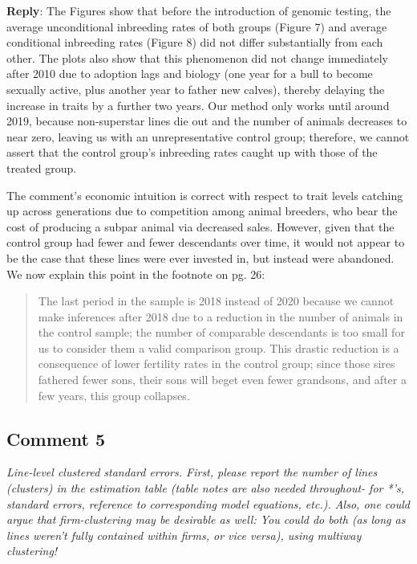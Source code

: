 \documentclass[12pt,letterpaper]{article}
\begin{document}
\textbf{Reply}: The Figures show that before the introduction of genomic testing, the average unconditional inbreeding rates of both groups (Figure 7) and average conditional inbreeding rates (Figure 8) did not differ substantially from each other. The plots also show that this phenomenon did not change immediately after 2010 due to adoption lags and biology (one year for a bull to become sexually active, plus another year to father new calves), thereby delaying the increase in traits by a further two years. Our method only works until around 2019, because non-superstar lines die out and the number of animals decreases to near zero, leaving us with an unrepresentative control group; therefore, we cannot assert that the control group's inbreeding rates caught up with those of the treated group.

The comment's economic intuition is correct with respect to trait levels catching up across generations due to competition among animal breeders, who bear the cost of producing a subpar animal via decreased sales. However, given that the control group had fewer and fewer descendants over time, it would not appear to be the case that these lines were ever invested in, but instead were abandoned. We now explain this point in the footnote on pg. 26:

\begin{quote}
    The last period in the sample is 2018 instead of 2020 because we cannot make inferences after 2018 due to a reduction in the number of animals in the control sample; the number of comparable descendants is too small for us to consider them a valid comparison group. This drastic reduction is a consequence of lower fertility rates in the control group; since those sires fathered fewer sons, their sons will beget even fewer grandsons, and after a few years, this group collapses.
\end{quote}

\subsection*{Comment 5}
{\it Line-level clustered standard errors. First, please report the number of lines
(clusters) in the estimation table (table notes are also needed throughout- for *’s, standard errors, reference to corresponding model equations, etc.). Also, one could argue that firm-clustering may be desirable as well: You could do both (as long as lines weren’t fully contained within firms, or vice versa), using multiway clustering!} \\
\end{document}

